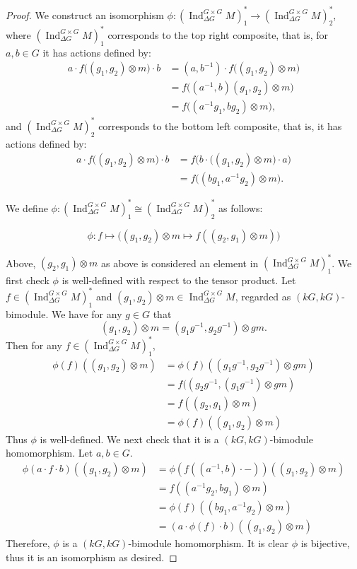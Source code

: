 \documentclass[10pt,letterpaper, boxed, cm]{amsart}
\newcommand{\inv}{^{-1}}
\newcommand{\Ind}{\operatorname{Ind}}
\theoremstyle{remark}
\theoremstyle{definition}
\begin{document}
	\begin{proof}
		We construct an isomorphism $\phi: (\Ind^{G\times G}_{\Delta G} M)^*_1 \to (\Ind^{G\times G}_{\Delta G} M)^*_2$, where $(\Ind^{G\times G}_{\Delta G} M)^*_1$ corresponds to the top right composite, that is, for $a,b \in G$ it has actions defined by:
		\begin{align*}
		a\cdot f\big((g_1,g_2)\otimes m\big) \cdot b &= (a,b\inv) \cdot f\big((g_1,g_2)\otimes m\big)\\
		&= f\big((a\inv, b)(g_1,g_2)\otimes m\big)\\
		&= f\big((a\inv g_1,bg_2)\otimes m\big),
		\end{align*}
		and $(\Ind^{G\times G}_{\Delta G} M)^*_2$ corresponds to the bottom left composite, that is, it has actions defined by:
		\begin{align*}
		a\cdot f\big((g_1,g_2)\otimes m\big) \cdot b &= f\big(b\cdot \big((g_1,g_2)\otimes m\big)\cdot a\big)\\
		&= f\big((bg_1,a\inv g_2)\otimes m\big).
		\end{align*}

        We define $\phi: (\Ind^{G\times G}_{\Delta G} M)^*_1 \cong (\Ind^{G\times G}_{\Delta G}M)^*_2$ as follows:

        \[\phi: f \mapsto \big((g_1,g_2)\otimes m \mapsto f((g_2,g_1)\otimes m)\big)\]

        Above, $(g_2,g_1)\otimes m$ as above is considered an element in $(\Ind^{G\times G}_{\Delta G} M)^*_1$. We first check $\phi$ is well-defined with respect to the tensor product. Let $f \in (\Ind^{G\times G}_{\Delta G} M)^*_1$ and $(g_1,g_2)\otimes m \in \Ind^{G\times G}_{\Delta G}M$, regarded as $(kG,kG)$-bimodule. We have for any $g \in G$ that \[(g_1,g_2)\otimes m = (g_1g\inv, g_2g\inv)\otimes gm.\]
        Then for any $f \in (\Ind^{G\times G}_{\Delta G} M)^*_1$,
        \begin{align*}
            \phi(f)((g_1,g_2)\otimes m)&= \phi(f)((g_1g\inv, g_2g\inv)\otimes gm)\\
            &= f((g_2g\inv, (g_1g\inv)\otimes gm)\\
            &= f((g_2, g_1)\otimes m)\\
            &=  \phi(f)((g_1,g_2)\otimes m)
        \end{align*}
        Thus $\phi$ is well-defined. We next check that it is a $(kG,kG)$-bimodule homomorphism. Let $a,b \in G$.
        \begin{align*}
            \phi(a\cdot f\cdot b)((g_1, g_2)\otimes m) &= \phi (f((a\inv, b)\cdot -))((g_1, g_2)\otimes m)\\
            &= f((a\inv g_2, bg_1)\otimes m)\\
            &= \phi(f)((bg_1, a\inv g_2)\otimes m)\\
            &=(a\cdot \phi(f)\cdot b)((g_1, g_2)\otimes m)
        \end{align*}
        Therefore, $\phi$ is a $(kG,kG)$-bimodule homomorphism. It is clear $\phi$ is bijective, thus it is an isomorphism as desired.


\end{proof}
\end{document}
